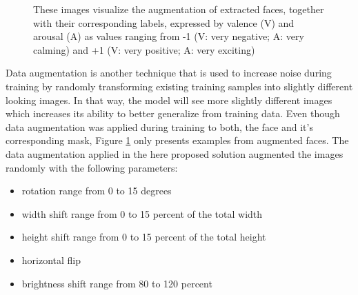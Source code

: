 \begin{figure}[htpb]
  \hfill
  \caption[Data Augmentation]{These images visualize the augmentation of extracted faces, together with their corresponding labels, expressed by valence (V) and arousal (A) as values ranging from -1 (V: very negative; A: very calming) and +1 (V: very positive; A: very exciting)}
  \label{fig:MethodologyDataAugmentation}
\end{figure}

\noindent Data augmentation is another technique that is used to increase noise during training by randomly transforming existing training samples into slightly different looking images. In that way, the model will see more slightly different images which increases its ability to better generalize from training data. Even though data augmentation was applied during training to both, the face and it's corresponding mask, Figure \ref{fig:MethodologyDataAugmentation} only presents examples from augmented faces.
\newline\newline
The data augmentation applied in the here proposed solution augmented the images randomly with the following parameters:

\begin{itemize}
    \item rotation range from 0 to 15 degrees
    \item width shift range from 0 to 15 percent of the total width
    \item height shift range from 0 to 15 percent of the total height
    \item horizontal flip
    \item brightness shift range from 80 to 120 percent
\end{itemize}

